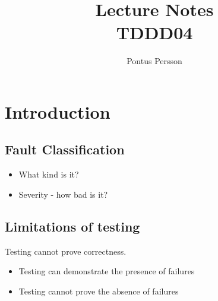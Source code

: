 \documentclass[a4paper]{article}
\author{Pontus Persson}
\title{Lecture Notes\\TDDD04}
\begin{document}
\maketitle
\tableofcontents

\section{Introduction}

\subsection{Fault Classification}

\begin{itemize}
\item What kind is it?
\item Severity - how bad is it?
\end{itemize}

\subsection{Limitations of testing}
\label{sec:limitations of testing}

Testing cannot prove correctness.
\begin{itemize}
\item Testing can demonstrate the presence of failures
\item Testing cannot prove the absence of failures
\end{itemize}
\end{document}
